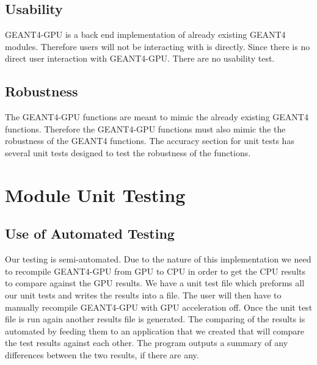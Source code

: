 \documentclass[12pt]{article}
\begin{document}
\subsection{Usability}
GEANT4-GPU is a back end implementation of already existing GEANT4 modules. Therefore users will not be interacting with is directly. Since there is no direct user interaction with GEANT4-GPU. There are no usability test. 
\subsection{Robustness}
The GEANT4-GPU functions are meant to mimic the already existing GEANT4 functions. Therefore the GEANT4-GPU functions must also mimic the the robustness of the GEANT4 functions. The accuracy section for unit tests has several unit tests designed to test the robustness of the functions. 
\newpage
\section{Module Unit Testing}
\subsection{Use of Automated Testing}
Our testing is semi-automated. Due to the nature of this implementation we need to recompile GEANT4-GPU from GPU to CPU in order to get the CPU results to compare against the GPU results. We have a unit test file which preforms all our unit tests and writes the results into a file. The user will then have to manually recompile GEANT4-GPU with GPU acceleration off. Once the unit test file is run again another results file is generated. The comparing of the results is automated by feeding them to an application that we created that will compare the test results against each other. The program outputs a summary of any differences between the two results, if there are any.
\end{document}
